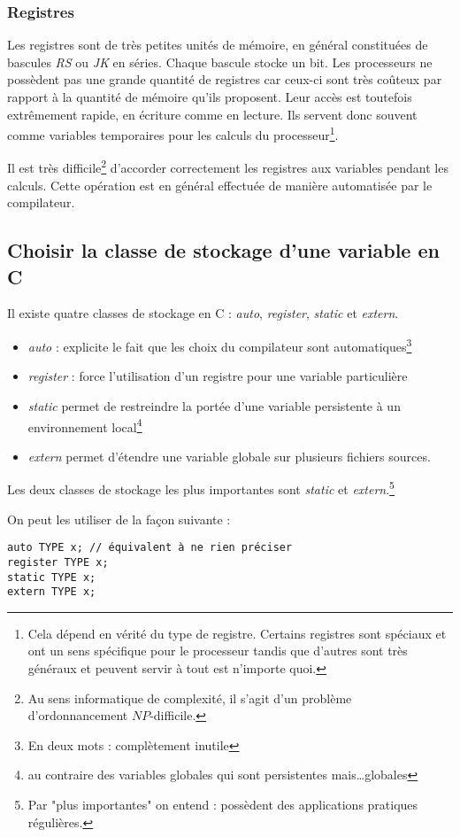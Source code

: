 \documentclass[../../../main.tex]{subfiles}
\begin{document}
\subsubsection{Registres}
Les registres sont de très petites unités de mémoire, en général constituées de bascules \textit{RS} ou \textit{JK} en séries. Chaque bascule stocke un bit. Les processeurs ne possèdent pas une grande quantité de registres car ceux-ci sont très coûteux par rapport à la quantité de mémoire qu'ils proposent. Leur accès est toutefois extrêmement rapide, en écriture comme en lecture. Ils servent donc souvent comme variables temporaires pour les calculs du processeur\footnote{Cela dépend en vérité du type de registre. Certains registres sont spéciaux et ont un sens spécifique pour le processeur tandis que d'autres sont très généraux et peuvent servir à tout est n'importe quoi.}.

Il est très difficile\footnote{Au sens informatique de complexité, il s'agit d'un problème d'ordonnancement $NP$-difficile.} d'accorder correctement les registres aux variables pendant les calculs. Cette opération est en général effectuée de manière automatisée par le compilateur.
\subsection{Choisir la classe de stockage d'une variable en C}
Il existe quatre classes de stockage en C : \textit{auto}, \textit{register}, \textit{static} et \textit{extern}.
\begin{itemize}
	\item \textit{auto} : explicite le fait que les choix du compilateur sont automatiques\footnote{En deux mots : complètement inutile}
	\item \textit{register} : force l'utilisation d'un registre pour une variable particulière
	\item \textit{static} permet de restreindre la portée d'une variable persistente à un environnement local\footnote{au contraire des variables globales qui sont persistentes mais\dots globales}
	\item \textit{extern} permet d'étendre une variable globale sur plusieurs fichiers sources.
\end{itemize}
Les deux classes de stockage les plus importantes sont \textit{static} et \textit{extern}.\footnote{Par "plus importantes" on entend : possèdent des applications pratiques régulières.}

On peut les utiliser de la façon suivante :
\begin{verbatim}
auto TYPE x; // équivalent à ne rien préciser
register TYPE x;
static TYPE x;
extern TYPE x;
\end{verbatim}
\end{document}
